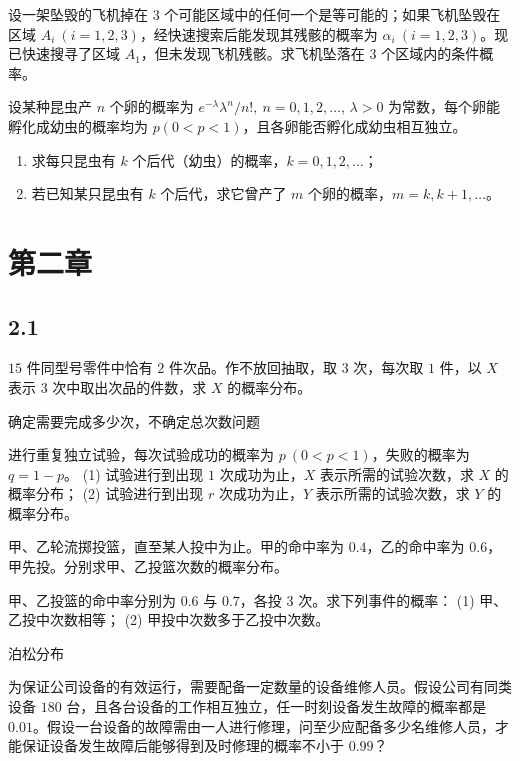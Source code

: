 \begin{homework}[1.27]
设一架坠毁的飞机掉在 $3$ 个可能区域中的任何一个是等可能的；如果飞机坠毁在区域 $A_i\ (i=1,2,3)$，经快速搜索后能发现其残骸的概率为 $\alpha_i\ (i=1,2,3)$。现已快速搜寻了区域 $A_1$，但未发现飞机残骸。求飞机坠落在 $3$ 个区域内的条件概率。
\end{homework}

\begin{homework}[1.28]
设某种昆虫产 $n$ 个卵的概率为 $e^{-\lambda}\lambda^n/n!,\ n=0,1,2,\dots$, $\lambda>0$ 为常数，每个卵能孵化成幼虫的概率均为 $p(0<p<1)$，且各卵能否孵化成幼虫相互独立。

\begin{enumerate}
  \item 求每只昆虫有 $k$ 个后代（幼虫）的概率，$k=0,1,2,\dots$；
  \item 若已知某只昆虫有 $k$ 个后代，求它曾产了 $m$ 个卵的概率，$m=k,k+1,\dots$。
\end{enumerate}
\end{homework}
\section{第二章}
\subsection*{2.1}
\begin{homework}[2.3]
$15$ 件同型号零件中恰有 $2$ 件次品。作不放回抽取，取 $3$ 次，每次取 $1$ 件，以 $X$ 表示 $3$ 次中取出次品的件数，求 $X$ 的概率分布。
\end{homework}
\begin{dxtips}
    确定需要完成多少次，不确定总次数问题
\end{dxtips}
\begin{homework}[2.4]
进行重复独立试验，每次试验成功的概率为 $p \ (0 < p < 1)$，失败的概率为 $q = 1 - p$。  
(1) 试验进行到出现 $1$ 次成功为止，$X$ 表示所需的试验次数，求 $X$ 的概率分布；  
(2) 试验进行到出现 $r$ 次成功为止，$Y$ 表示所需的试验次数，求 $Y$ 的概率分布。
\end{homework}

\begin{homework}[2.5]
甲、乙轮流掷投篮，直至某人投中为止。甲的命中率为 $0.4$，乙的命中率为 $0.6$，甲先投。分别求甲、乙投篮次数的概率分布。
\end{homework}

\begin{homework}[2.9]
甲、乙投篮的命中率分别为 $0.6$ 与 $0.7$，各投 $3$ 次。求下列事件的概率：  
(1) 甲、乙投中次数相等；  
(2) 甲投中次数多于乙投中次数。
\end{homework}
\begin{dxtips}
泊松分布
\end{dxtips}
\begin{homework}[2.12]
为保证公司设备的有效运行，需要配备一定数量的设备维修人员。假设公司有同类设备 $180$ 台，且各台设备的工作相互独立，任一时刻设备发生故障的概率都是 $0.01$。假设一台设备的故障需由一人进行修理，问至少应配备多少名维修人员，才能保证设备发生故障后能够得到及时修理的概率不小于 $0.99$？
\end{homework}

